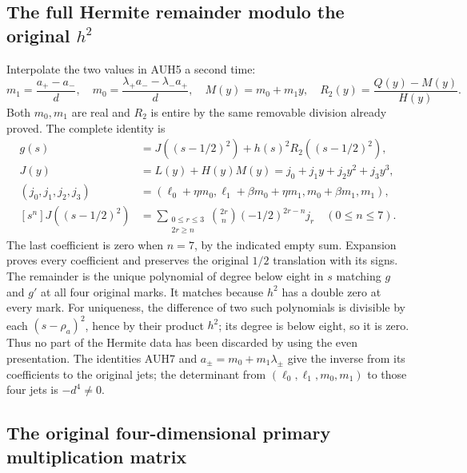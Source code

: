 \documentclass[11pt]{article}
\begin{document}
\subsection{The full Hermite remainder modulo the original $h^2$}

Interpolate the two values in AUH5 a second time:
\[
 m_1=\frac{a_+-a_-}{d},\quad
 m_0=\frac{\lambda_+a_--\lambda_-a_+}{d},\quad
M(y)=m_0+m_1y,\quad
 R_2(y)=\frac{Q(y)-M(y)}{H(y)}.
 \tag{AUH9}
\]
Both $m_0,m_1$ are real and $R_2$ is entire by the same removable
division already proved.  The complete identity is
\[
\begin{aligned}
 g(s)&=J((s-1/2)^2)+h(s)^2R_2((s-1/2)^2),\\
 J(y)&=L(y)+H(y)M(y)=j_0+j_1y+j_2y^2+j_3y^3,\\
 (j_0,j_1,j_2,j_3)&=(\ell_0+\eta m_0,
       \ell_1+\beta m_0+\eta m_1,m_0+\beta m_1,m_1),\\
 [s^n]J((s-1/2)^2)&=
   \sum_{\substack{0\le r\le3\\2r\ge n}}
     \binom{2r}{n}(-1/2)^{2r-n}j_r\quad(0\le n\le7).
\end{aligned}\tag{AUH10}
\]
The last coefficient is zero when $n=7$, by the indicated empty sum.
Expansion proves every coefficient and preserves the original
$1/2$ translation with its signs.
The remainder is the unique polynomial of degree below eight in
$s$ matching $g$ and $g'$ at all four original marks.
It matches because $h^2$ has a double zero at every mark.
For uniqueness, the difference of two such polynomials is divisible
by each $(s-\rho_a)^2$, hence by their product $h^2$; its degree
is below eight, so it is zero.
Thus no part of the Hermite data has been discarded by using the
even presentation.  The identities AUH7 and
$a_\pm=m_0+m_1\lambda_\pm$ give the inverse from its coefficients
to the original jets; the determinant from
$(\ell_0,\ell_1,m_0,m_1)$ to those four jets is $-d^4\ne0$.

\subsection{The original four-dimensional primary multiplication matrix}
\end{document}
